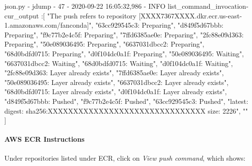 \documentclass[
]{book}
\newenvironment{Shaded}{\begin{snugshade}}{\end{snugshade}}
\newcommand{\ExtensionTok}[1]{#1}
\newcommand{\NormalTok}[1]{#1}
\newcommand{\StringTok}[1]{\textcolor[rgb]{0.31,0.60,0.02}{#1}}
\begin{document}
\begin{Shaded}
\begin{Highlighting}[]
\ExtensionTok{json.py}\NormalTok{ - jdump - 47 -  2020-09-22 16:05:32,986 - INFO list_command_invocation-cur_output}
\NormalTok{:[}
    \StringTok{"The push refers to repository [XXXX7367XXXX.dkr.ecr.us-east-1.amazonaws.com/fanconda]"}\NormalTok{,}
    \StringTok{"63cc929545c3: Preparing"}\NormalTok{,}
    \StringTok{"d849f5d67bbb: Preparing"}\NormalTok{,}
    \StringTok{"f9c77b2e4c5f: Preparing"}\NormalTok{,}
    \StringTok{"7ffd6385ae0e: Preparing"}\NormalTok{,}
    \StringTok{"2fc88e09d363: Preparing"}\NormalTok{,}
    \StringTok{"50e089036495: Preparing"}\NormalTok{,}
    \StringTok{"6637031dbcc2: Preparing"}\NormalTok{,}
    \StringTok{"68d0bdfd0715: Preparing"}\NormalTok{,}
    \StringTok{"d0f104dc0a1f: Preparing"}\NormalTok{,}
    \StringTok{"50e089036495: Waiting"}\NormalTok{,}
    \StringTok{"6637031dbcc2: Waiting"}\NormalTok{,}
    \StringTok{"68d0bdfd0715: Waiting"}\NormalTok{,}
    \StringTok{"d0f104dc0a1f: Waiting"}\NormalTok{,}
    \StringTok{"2fc88e09d363: Layer already exists"}\NormalTok{,}
    \StringTok{"7ffd6385ae0e: Layer already exists"}\NormalTok{,}
    \StringTok{"50e089036495: Layer already exists"}\NormalTok{,}
    \StringTok{"6637031dbcc2: Layer already exists"}\NormalTok{,}
    \StringTok{"68d0bdfd0715: Layer already exists"}\NormalTok{,}
    \StringTok{"d0f104dc0a1f: Layer already exists"}\NormalTok{,}
    \StringTok{"d849f5d67bbb: Pushed"}\NormalTok{,}
    \StringTok{"f9c77b2e4c5f: Pushed"}\NormalTok{,}
    \StringTok{"63cc929545c3: Pushed"}\NormalTok{,}
    \StringTok{"latest: digest: sha256:XXXXXXXXXXXXXXXXXXXXXXXXXXXXXXX size: 2226"}\NormalTok{,}
    \StringTok{""}
\NormalTok{]}
\end{Highlighting}
\end{Shaded}

\hypertarget{aws-ecr-instructions}{%
\paragraph{AWS ECR Instructions}\label{aws-ecr-instructions}}

Under repositories listed under ECR, click on \emph{View push command}, which shows:
\end{document}
